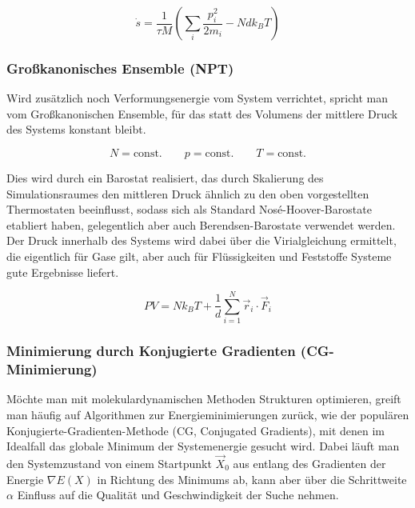 \begin{equation}
  \dot s = \frac{1}{\tau M} \left(\sum_i{\frac{p_i^2}{2m_i}} - N d k_B T\right)
\end{equation}

\subsubsection{Großkanonisches Ensemble (NPT)}

Wird zusätzlich noch Verformungsenergie vom System verrichtet, spricht man vom Großkanonischen Ensemble, für das statt des Volumens der mittlere Druck des Systems konstant bleibt.

\begin{equation}
  N = \text{const.}
  \qquad
  p = \text{const.}
  \qquad
  T = \text{const.}
\end{equation}

Dies wird durch ein Barostat realisiert, das durch Skalierung des Simulationsraumes den mittleren Druck ähnlich zu den oben vorgestellten Thermostaten beeinflusst, sodass sich als Standard Nosé-Hoover-Barostate etabliert haben, gelegentlich aber auch Berendsen-Barostate verwendet werden.
Der Druck innerhalb des Systems wird dabei über die Virialgleichung ermittelt, die eigentlich für Gase gilt, aber auch für Flüssigkeiten und Feststoffe Systeme gute Ergebnisse liefert.

\begin{equation}
  P V = N k_B T + \frac{1}{d} \sum_{i=1}^N{\vec{r}_i \cdot \vec{F}_i}
\end{equation}

\subsubsection{Minimierung durch Konjugierte Gradienten (CG-Minimierung)}


Möchte man mit molekulardynamischen Methoden Strukturen optimieren, greift man häufig auf Algorithmen zur Energieminimierungen zurück, wie der populären Konjugierte-Gradienten-Methode (CG, Conjugated Gradients), mit denen im Idealfall das globale Minimum der Systemenergie gesucht wird.
Dabei läuft man den Systemzustand von einem Startpunkt $\vec X_0$ aus entlang des Gradienten der Energie $\nabla E(X)$ in Richtung des Minimums ab, kann aber über die Schrittweite $\alpha$ Einfluss auf die Qualität und Geschwindigkeit der Suche nehmen.

